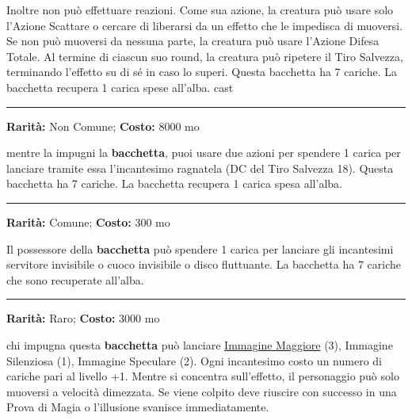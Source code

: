 \begin{multicols}{2}
Inoltre non può effettuare reazioni. Come sua azione, la creatura può usare solo l'Azione Scattare o cercare di liberarsi da un effetto che le impedisca di muoversi. Se non può muoversi da nessuna parte, la creatura può usare l'Azione Difesa Totale. Al termine di ciascun suo round, la creatura può ripetere il Tiro Salvezza, terminando l'effetto su di sé in caso lo superi. Questa bacchetta ha 7 cariche. La bacchetta recupera 1 carica spese all'alba.
cast
\smallskip\noindent\rule{\linewidth}{2pt}  \hypertarget{BacchettadellaRagnatela}{}\smallskip{}\noindent\label{BacchettadellaRagnatela}

\textbf{Rarità:} Non Comune; \textbf{Costo:} 8000 mo

mentre la impugni la \textbf{bacchetta}, puoi usare due azioni per spendere 1 carica per lanciare tramite essa l'incantesimo ragnatela (DC del Tiro Salvezza 18). Questa bacchetta ha 7 cariche. La bacchetta recupera 1 carica spesa all'alba.

\smallskip\noindent\rule{\linewidth}{2pt}  \hypertarget{BacchettadelleComodità}{}\smallskip{}\noindent\label{BacchettadelleComodità}

\textbf{Rarità:} Comune; \textbf{Costo:} 300 mo

Il possessore della \textbf{bacchetta} può spendere 1 carica per lanciare gli incantesimi servitore invisibile o cuoco invisibile o disco fluttuante. La bacchetta ha 7 cariche che sono recuperate all'alba.

\smallskip\noindent\rule{\linewidth}{2pt}  \hypertarget{BacchettadelleIllusioni}{}\smallskip{}\noindent\label{BacchettadelleIllusioni}

\textbf{Rarità:} Raro; \textbf{Costo:} 3000 mo

chi impugna questa \textbf{bacchetta} può lanciare \hyperlink{Immagine Maggiore}{Immagine Maggiore} (3), Immagine Silenziosa (1), Immagine Speculare (2). Ogni incantesimo costo un numero di cariche pari al livello +1. Mentre si concentra sull'effetto, il personaggio può solo muoversi a velocità dimezzata. Se viene colpito deve riuscire con successo in una Prova di Magia o l'illusione svanisce immediatamente.


\end{multicols}
